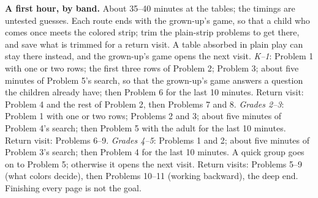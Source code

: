 \documentclass[11pt]{article}
\begin{document}
\textbf{A first hour, by band.} About 35--40 minutes at the tables; the timings are untested guesses. Each route ends with the grown-up's game, so that a child who comes once meets the colored strip; trim the plain-strip problems to get there, and save what is trimmed for a return visit. A table absorbed in plain play can stay there instead, and the grown-up's game opens the next visit. \emph{K--1}: Problem 1 with one or two rows; the first three rows of Problem 2; Problem 3; about five minutes of Problem 5's search, so that the grown-up's game answers a question the children already have; then Problem 6 for the last 10 minutes. Return visit: Problem 4 and the rest of Problem 2, then Problems 7 and 8. \emph{Grades 2--3}: Problem 1 with one or two rows; Problems 2 and 3; about five minutes of Problem 4's search; then Problem 5 with the adult for the last 10 minutes. Return visit: Problems 6--9. \emph{Grades 4--5}: Problems 1 and 2; about five minutes of Problem 3's search; then Problem 4 for the last 10 minutes. A quick group goes on to Problem 5; otherwise it opens the next visit. Return visits: Problems 5--9 (what colors decide), then Problems 10--11 (working backward), the deep end. Finishing every page is not the goal.


\end{document}
